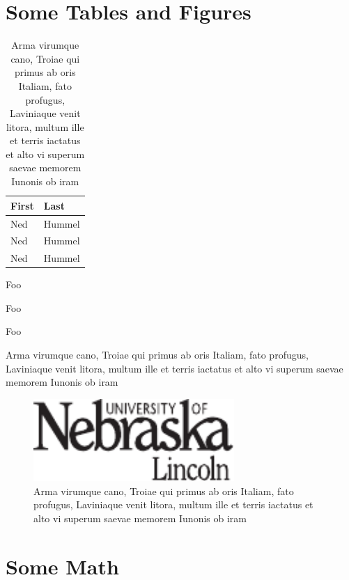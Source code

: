 \chapter{Some Tables and Figures}

\begin{table}[h]
  \centering
  \begin{tabular}{ll}\toprule
    First & Last \\ \midrule
    Ned & Hummel \\
    Ned & Hummel \\
    Ned & Hummel \\ \bottomrule
  \end{tabular}
  \caption{Arma virumque cano, Troiae qui primus ab oris Italiam, fato profugus,
Laviniaque venit litora, multum ille et terris iactatus et alto vi
superum saevae memorem Iunonis ob iram}
  \label{tab:tabular}
\end{table}

\begin{table}[h]
  \centering

  \begin{compactitem}[\checkmark]
    \item Foo
    \item Foo
    \item Foo
    \end{compactitem}

  \caption{Arma virumque cano, Troiae qui primus ab oris Italiam, fato profugus,
Laviniaque venit litora, multum ille et terris iactatus et alto vi
superum saevae memorem Iunonis ob iram}
  \label{tab:list}
\end{table}

\begin{figure}[h]
  \centering
  \includegraphics[width=3in]{figures/unl}
  \caption{Arma virumque cano, Troiae qui primus ab oris Italiam, fato profugus,
Laviniaque venit litora, multum ille et terris iactatus et alto vi
superum saevae memorem Iunonis ob iram}
  \label{fig:test}
\end{figure}

\chapter{Some Math}\label{chap:math}

